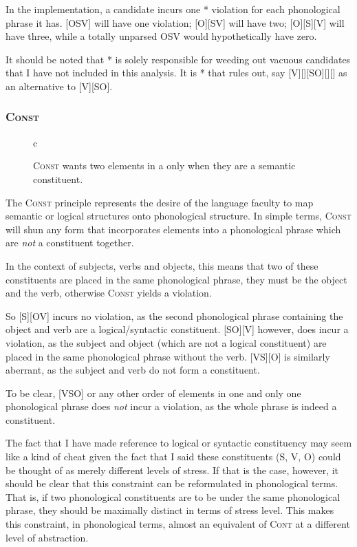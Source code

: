 \documentclass{article}
\newcommand{\cont}{\textsc{Cont}}
\newcommand{\cons}{\textsc{Const}}
\newcommand{\nophi}{\textsc{*\textphi}}
\begin{document}
In the implementation, a candidate incurs one {\nophi} violation for each phonological phrase it has.
[OSV] will have one violation; [O][SV] will have two; [O][S][V] will have three, while a totally unparsed OSV would hypothetically have zero.

It should be noted that {\nophi} is solely responsible for weeding out vacuous candidates that I have not included in this analysis.
It is {\nophi} that rules out, say [V][][SO][][] as an alternative to [V][SO].

\subsubsection{\cons}

\begin{figure}
\begin{center}
\begin{tableau}{c}
		\const{\cons}
	\cand{[SO][V]} \vio{*!}
	\cand[\Optimal]{[S][VO]} \vio{}
\end{tableau}
\end{center}
	\caption{{\cons} wants two elements in a {\textphi} only when they are a semantic constituent.}
\end{figure}

The {\cons} principle represents the desire of the language faculty to map semantic or logical structures onto phonological structure.
In simple terms, {\cons} will shun any form that incorporates elements into a phonological phrase which are \emph{not} a constituent together.

In the context of subjects, verbs and objects, this means that two of these constituents are placed in the same phonological phrase, they must be the object and the verb, otherwise {\cons} yields a violation.

So [S][OV] incurs no violation, as the second phonological phrase containing the object and verb are a logical/syntactic constituent.
[SO][V] however, does incur a violation, as the subject and object (which are not a logical constituent) are placed in the same phonological phrase without the verb.
[VS][O] is similarly aberrant, as the subject and verb do not form a constituent.

To be clear, [VSO] or any other order of elements in one and only one phonological phrase does \emph{not} incur a violation, as the whole phrase is indeed a constituent.

 The fact that I have made reference to logical or syntactic constituency may seem like a kind of cheat given the fact that I said these constituents (S, V, O) could be thought of as merely different levels of stress.
 If that is the case, however, it should be clear that this constraint can be reformulated in phonological terms.
 That is, if two phonological constituents are to be under the same phonological phrase, they should be maximally distinct in terms of stress level.
 This makes this constraint, in phonological terms, almost an equivalent of {\cont} at a different level of abstraction.
\end{document}
